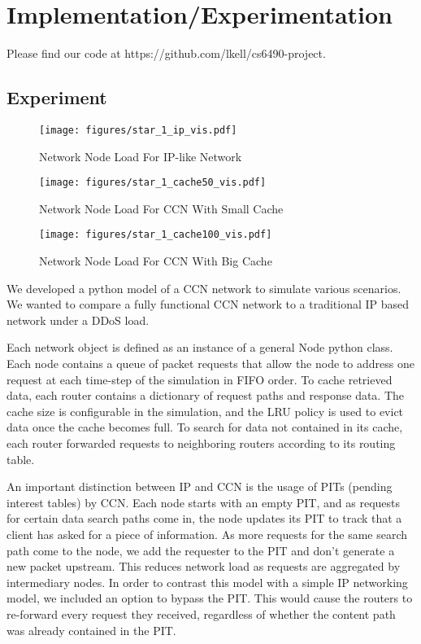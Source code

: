 \documentclass[conference,compsoc, 10pt]{IEEEtran}
\begin{document}
\section{Implementation/Experimentation}

Please find our code at https://github.com/lkell/cs6490-project.

\subsection{Experiment}

\begin{figure}[h]
\centering
\texttt{[image: figures/star\_1\_ip\_vis.pdf]}
\caption{Network Node Load For IP-like Network}
\label{fig:x ip-load}
\end{figure}

\begin{figure}[h]
\centering
\texttt{[image: figures/star\_1\_cache50\_vis.pdf]}
\caption{Network Node Load For CCN With Small Cache}
\label{fig:x ccn-load-small}
\end{figure}

\begin{figure}[h]
\centering
\texttt{[image: figures/star\_1\_cache100\_vis.pdf]}
\caption{Network Node Load For CCN With Big Cache}
\label{fig:x ccn-load-big}
\end{figure}

We developed a python model of a CCN network to simulate various scenarios. We wanted to compare a fully functional CCN network to a traditional IP based network under a DDoS load.

Each network object is defined as an instance of a general Node python class. Each node contains a queue of packet requests that allow the node to address one request at each time-step of the simulation in FIFO order. To cache retrieved data, each router contains a dictionary of request paths and response data. The cache size is configurable in the simulation, and the LRU policy is used to evict data once the cache becomes full. To search for data not contained in its cache, each router forwarded requests to neighboring routers according to its routing table.

An important distinction between IP and CCN is the usage of PITs (pending interest tables) by CCN. Each node starts with an empty PIT, and as requests for certain data search paths come in, the node updates its PIT to track that a client has asked for a piece of information. As more requests for the same search path come to the node, we add the requester to the PIT and don't generate a new packet upstream. This reduces network load as requests are aggregated by intermediary nodes. In order to contrast this model with a simple IP networking model, we included an option to bypass the PIT. This would cause the routers to re-forward every request they received, regardless of whether the content path was already contained in the PIT.
\end{document}
